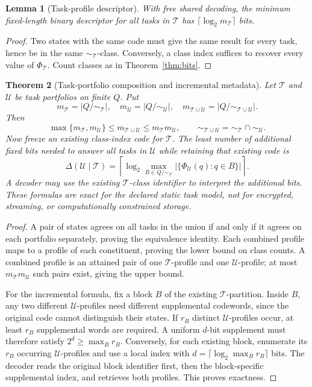 \documentclass[11pt,letterpaper]{article}
\newtheorem{theorem}{Theorem}[section]
\newtheorem{lemma}[theorem]{Lemma}
\newcommand{\calT}{\mathcal{T}}
\newcommand{\calU}{\mathcal{U}}
\begin{document}
\begin{lemma}[Task-profile descriptor]\label{lem:task}
With free shared decoding, the minimum fixed-length binary descriptor for all tasks in $\calT$ has $\lceil\log_2 m_{\calT}\rceil$ bits.
\end{lemma}
\begin{proof}
Two states with the same code must give the same result for every task, hence be in the same $\sim_{\calT}$-class. Conversely, a class index suffices to recover every value of $\Phi_{\calT}$. Count classes as in Theorem~\ref{thm:bits}.
\end{proof}

\begin{theorem}[Task-portfolio composition and incremental metadata]\label{thm:portfolio}
Let $\calT$ and $\calU$ be task portfolios on finite $Q$. Put
\[
 m_{\calT}=|Q/\sim_{\calT}|,\quad m_{\calU}=|Q/\sim_{\calU}|,
\quad m_{\calT\cup\calU}=|Q/\sim_{\calT\cup\calU}|.
\]
Then
\begin{equation}\label{eq:portfolio-bound}
\max\{m_{\calT},m_{\calU}\}\le m_{\calT\cup\calU}\le m_{\calT}m_{\calU},
\qquad
\sim_{\calT\cup\calU}=\sim_{\calT}\cap\sim_{\calU}.
\end{equation}
Now freeze an existing \emph{class-index} code for $\calT$. The least number of \emph{additional fixed bits} needed to answer all tasks in $\calU$ while retaining that existing code is
\begin{equation}\label{eq:incremental}
 \Delta(\calU\mid\calT)=\left\lceil \log_2
 \max_{B\in Q/\sim_{\calT}}\bigl|\{\Phi_{\calU}(q):q\in B\}\bigr| \right\rceil.
\end{equation}
A decoder may use the existing $\calT$-class identifier to interpret the additional bits. These formulas are exact for the declared static task model, not for encrypted, streaming, or computationally constrained storage.
\end{theorem}
\begin{proof}
A pair of states agrees on all tasks in the union if and only if it agrees on each portfolio separately, proving the equivalence identity. Each combined profile maps to a profile of each constituent, proving the lower bound on class counts. A combined profile is an attained pair of one $\calT$-profile and one $\calU$-profile; at most $m_{\calT}m_{\calU}$ such pairs exist, giving the upper bound.

For the incremental formula, fix a block $B$ of the existing $\calT$-partition. Inside $B$, any two different $\calU$-profiles need different supplemental codewords, since the original code cannot distinguish their states. If $r_B$ distinct $\calU$-profiles occur, at least $r_B$ supplemental words are required. A uniform $d$-bit supplement must therefore satisfy $2^d\ge\max_Br_B$. Conversely, for each existing block, enumerate its $r_B$ occurring $\calU$-profiles and use a local index with $d=\lceil\log_2\max_Br_B\rceil$ bits. The decoder reads the original block identifier first, then the block-specific supplemental index, and retrieves both profiles. This proves exactness.
\end{proof}
\end{document}
